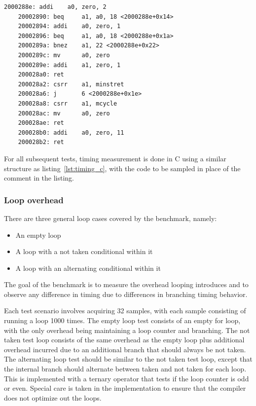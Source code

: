 \documentclass{article}
\begin{document}
\begin{lstlisting}[caption={Tock Perf capsule disassembly}, label={lst:tock_perf}]
    2000288e: addi    a0, zero, 2
    20002890: beq     a1, a0, 18 <2000288e+0x14>
    20002894: addi    a0, zero, 1
    20002896: beq     a1, a0, 18 <2000288e+0x1a>
    2000289a: bnez    a1, 22 <2000288e+0x22>
    2000289c: mv      a0, zero
    2000289e: addi    a1, zero, 1
    200028a0: ret
    200028a2: csrr    a1, minstret
    200028a6: j       6 <2000288e+0x1e>
    200028a8: csrr    a1, mcycle
    200028ac: mv      a0, zero
    200028ae: ret
    200028b0: addi    a0, zero, 11
    200028b2: ret
\end{lstlisting}

For all subsequent tests, timing measurement is done in C using a similar structure as listing~\ref{lst:timing_c}, with the code to be sampled in place of the comment in the listing.

\subsubsection{Loop overhead} \label{subsubsec:loop_overhead}

There are three general loop cases covered by the benchmark, namely:

\begin{itemize}
    \item An empty loop
    \item A loop with a not taken conditional within it
    \item A loop with an alternating conditional within it
\end{itemize}

The goal of the benchmark is to measure the overhead looping introduces and to observe any difference in timing due to differences in branching timing behavior.

Each test scenario involves acquiring 32 samples, with each sample consisting of running a loop 1000 times. The empty loop test consists of an empty for loop, with the only overhead being maintaining a loop counter and branching. The not taken test loop consists of the same overhead as the empty loop plus additional overhead incurred due to an additional branch that should always be not taken. The alternating loop test should be similar to the not taken test loop, except that the internal branch should alternate between taken and not taken for each loop. This is implemented with a ternary operator that tests if the loop counter is odd or even. Special care is taken in the implementation to ensure that the compiler does not optimize out the loops.
\end{document}
